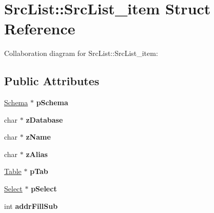\hypertarget{structSrcList_1_1SrcList__item}{}\section{Src\+List\+:\+:Src\+List\+\_\+item Struct Reference}
\label{structSrcList_1_1SrcList__item}


Collaboration diagram for Src\+List\+:\+:Src\+List\+\_\+item\+:
\subsection*{Public Attributes}
\begin{DoxyCompactItemize}
\item 
\hyperlink{structSchema}{Schema} $\ast$ {\bfseries p\+Schema}\hypertarget{structSrcList_1_1SrcList__item_a021ffb4d9282b6ce171bd57c4da97bf3}{}\label{structSrcList_1_1SrcList__item_a021ffb4d9282b6ce171bd57c4da97bf3}

\item 
char $\ast$ {\bfseries z\+Database}\hypertarget{structSrcList_1_1SrcList__item_a2f7bf0921794dc46d74d2546fc10f7de}{}\label{structSrcList_1_1SrcList__item_a2f7bf0921794dc46d74d2546fc10f7de}

\item 
char $\ast$ {\bfseries z\+Name}\hypertarget{structSrcList_1_1SrcList__item_afee5c5a84594fed8100be3cdb3e3ff1c}{}\label{structSrcList_1_1SrcList__item_afee5c5a84594fed8100be3cdb3e3ff1c}

\item 
char $\ast$ {\bfseries z\+Alias}\hypertarget{structSrcList_1_1SrcList__item_a461ef8d80828ed8dd4409b9244ae2919}{}\label{structSrcList_1_1SrcList__item_a461ef8d80828ed8dd4409b9244ae2919}

\item 
\hyperlink{structTable}{Table} $\ast$ {\bfseries p\+Tab}\hypertarget{structSrcList_1_1SrcList__item_a8779b2d10d0e25af78ad90e57f9cd4f6}{}\label{structSrcList_1_1SrcList__item_a8779b2d10d0e25af78ad90e57f9cd4f6}

\item 
\hyperlink{structSelect}{Select} $\ast$ {\bfseries p\+Select}\hypertarget{structSrcList_1_1SrcList__item_ab44822fca7618c4f41f4f770ad41425b}{}\label{structSrcList_1_1SrcList__item_ab44822fca7618c4f41f4f770ad41425b}

\item 
int {\bfseries addr\+Fill\+Sub}\hypertarget{structSrcList_1_1SrcList__item_a1fb4f55d13641e11f07c3e535fd7cf1d}{}\label{structSrcList_1_1SrcList__item_a1fb4f55d13641e11f07c3e535fd7cf1d}


\end{DoxyCompactItemize}
